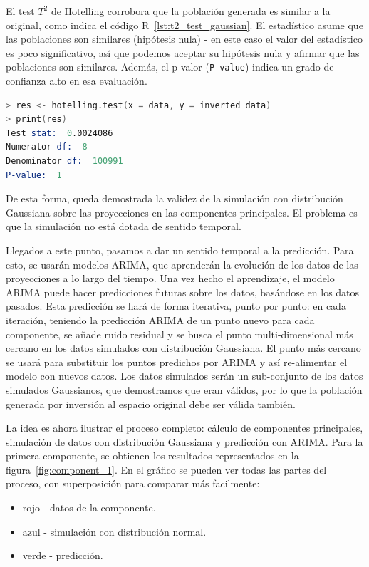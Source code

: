 \documentclass[11pt,spanish,listoffigures,listoftables]{tfgetsinf}
\begin{document}
    El test \(T^2\) de Hotelling corrobora que la población generada es similar a la original, como indica el código R~\ref{lst:t2_test_gaussian}. El estadístico asume que las poblaciones son similares (hipótesis nula) - en este caso el valor del estadístico es poco significativo, así que podemos aceptar su hipótesis nula y afirmar que las poblaciones son similares. Además, el p-valor ({\tt P-value}) indica un grado de confianza alto en esa evaluación.
    
    \begin{lstlisting}[language=S, caption=Test \(T^2\) de Hotelling en R., label={lst:t2_test_gaussian}]
> res <- hotelling.test(x = data, y = inverted_data)
> print(res)
Test stat:  0.0024086 
Numerator df:  8 
Denominator df:  100991 
P-value:  1
    \end{lstlisting}
    
    De esta forma, queda demostrada la validez de la simulación con distribución Gaussiana sobre las proyecciones en las componentes principales. El problema es que la simulación no está dotada de sentido temporal.
        
    Llegados a este punto, pasamos a dar un sentido temporal a la predicción. Para esto, se usarán modelos ARIMA, que aprenderán la evolución de los datos de las proyecciones a lo largo del tiempo. Una vez hecho el aprendizaje, el modelo ARIMA puede hacer predicciones futuras sobre los datos, basándose en los datos pasados. Esta predicción se hará de forma iterativa, punto por punto: en cada iteración, teniendo la predicción ARIMA de un punto nuevo para cada componente, se añade ruido residual y se busca el punto multi-dimensional más cercano en los datos simulados con distribución Gaussiana. El punto más cercano se usará para substituir los puntos predichos por ARIMA y así re-alimentar el modelo con nuevos datos. Los datos simulados serán un sub-conjunto de los datos simulados Gaussianos, que demostramos que eran válidos, por lo que la población generada por inversión al espacio original debe ser válida también.
    
    La idea es ahora ilustrar el proceso completo: cálculo de componentes principales, simulación de datos con distribución Gaussiana y predicción con ARIMA. Para la primera componente, se obtienen los resultados representados en la figura~\ref{fig:component_1}. En el gráfico se pueden ver todas las partes del proceso, con superposición para comparar más facilmente:
    \begin{itemize}
        \item rojo - datos de la componente.
        \item azul - simulación con distribución normal.
        \item verde - predicción.
    \end{itemize}
    
\end{document}

